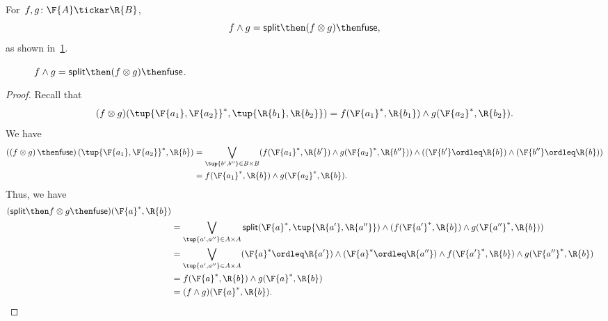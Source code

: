 \begin{lemma}
\label{lemma:intersection}
For~$f,g \colon \F{A} \tickar \R{B}$,
\begin{equation}
f \wedge g = \mathsf{split} \then (f \otimes g) \then \mathsf{fuse},
\end{equation}
as shown in~\cref{fig:lemmasplitfuse}.
\begin{figure}[h!]
\begin{center}
\end{center}
\caption{$f \wedge g = \mathsf{split} \then (f \otimes g) \then \mathsf{fuse}$. \label{fig:lemmasplitfuse}}
\end{figure}
\end{lemma}


\begin{proof}
Recall that 
    \begin{equation}
        (f\otimes g)(\tup{\F{a_1},\F{a_2}}^*,\tup{\R{b_1},\R{b_2}})=f(\F{a_1}^*,\R{b_1})\wedge g(\F{a_2}^*,\R{b_2}).
    \end{equation}
We have
    \begin{equation}
        \begin{aligned}
            \left(\left(f\otimes g\right) \then \mathsf{fuse}\right)(\tup{\F{a_1},\F{a_2}}^*,\R{b})&=\bigvee_{\tup{b',b''}\in B\times B}(f(\F{a_1}^*,\R{b'})\wedge g(\F{a_2}^*,\R{b''}))\wedge ((\F{b'}\ordleq \R{b}) \wedge (\F{b''}\ordleq \R{b}))\\
            &=f(\F{a_1}^*,\R{b})\wedge g(\F{a_2}^*,\R{b}).
        \end{aligned}
    \end{equation}
Thus, we have
    \begin{equation}
        \begin{aligned}
        (\mathsf{split}\then f\otimes g\then \mathsf{fuse})(\F{a}^*,\R{b})\\&=\bigvee_{\tup{a',a''}\in A\times A} \mathsf{split}(\F{a}^*,\tup{\R{a'},\R{a''}})\wedge (f(\F{a'}^*,\R{b})\wedge g(\F{a''}^*,\R{b}))\\
        &=\bigvee_{\tup{a',a''}\in A\times A}(\F{a}^*\ordleq \R{a'})\wedge (\F{a}^*\ordleq \R{a''})\wedge f(\F{a'}^*,\R{b})\wedge g(\F{a''}^*,\R{b})\\
        &=f(\F{a}^*,\R{b})\wedge g(\F{a}^*,\R{b})\\
        &=(f\wedge g)(\F{a}^*,\R{b}).
        \end{aligned}
    \end{equation}
\end{proof}

